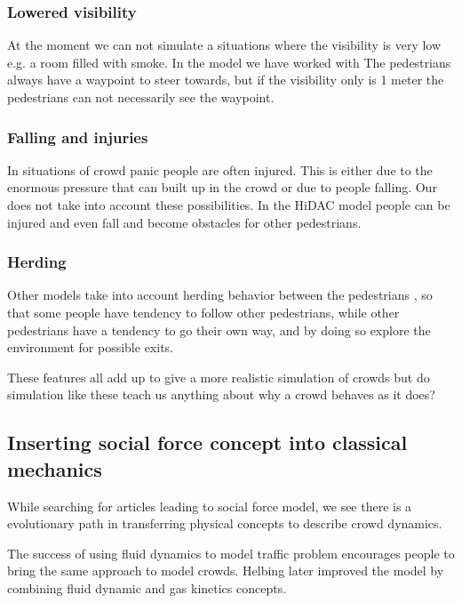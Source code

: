\subsubsection{Lowered visibility}
At the moment we can not simulate a situations where the visibility is very low 
e.g. a room filled with smoke. In the model we have worked with The pedestrians always 
have a waypoint to steer towards, but if the visibility only is 1 meter the 
pedestrians can not necessarily see the waypoint. \cite{HelbingNew}

\subsubsection{Falling and injuries}
In situations of crowd panic people are often injured. This is either due to the 
enormous pressure that can built up in the crowd or due to people falling. Our 
does not take into account these possibilities. In the HiDAC model people can 
be injured and even fall and become obstacles for other pedestrians.\cite{HiDAC}

\subsubsection{Herding}
Other models take into account herding behavior between the pedestrians  
\cite{helbing00}, so that some people have tendency to follow other pedestrians, 
while other pedestrians have a tendency to go their own way,  and by doing so 
explore the environment for possible exits.

These features all add up to give a more realistic simulation of crowds 
but do simulation like these teach us anything about why a crowd behaves 
as it does?

\subsection{Inserting social force concept into classical mechanics}
\label{subsec:development}
While searching for articles leading to social force model, we see there is a 
evolutionary path in transferring physical concepts to describe crowd dynamics.

The success of using fluid dynamics to model traffic problem encourages 
people to bring the same approach to model crowds. Helbing later improved the  
model by combining fluid dynamic and gas kinetics concepts\cite{social-force}. 


